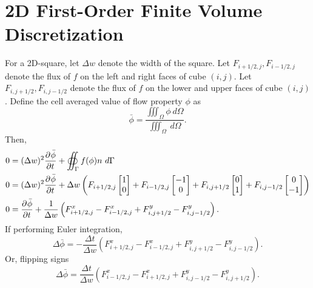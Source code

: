 \documentclass{doc}
\begin{document}
\section{2D First-Order Finite Volume Discretization}
For a 2D-square, let $\Delta w$ denote the width of the square.
Let $F_{i+1/2,j}, F_{i-1/2,j}$ denote the flux of $f$ on
the left and right faces of cube $(i,j)$.
Let $F_{i,j+1/2}, F_{i,j-1/2}$ denote the flux of $f$ on
the lower and upper faces of cube $(i,j)$.
%
Define the cell averaged value of flow property $\phi$ as
\begin{equation}
    \bar{\phi} = \frac{\iiint_\Omega \phi\ d\Omega}{\iiint_\Omega \ d\Omega}.
\end{equation}
Then,
\begin{align}
    0 &= (\Delta w)^2 \pd{\bar{\phi}}{t} + \oiint_\Gamma f(\phi) n \ d\Gamma \\
    0 &= (\Delta w)^2 \pd{\bar{\phi}}{t} + \Delta w \left(
        F_{i+1/2,j} \begin{bmatrix} 1\\  0 \end{bmatrix} +
        F_{i-1/2,j} \begin{bmatrix}-1\\  0 \end{bmatrix} +
        F_{i,j+1/2} \begin{bmatrix} 0\\  1 \end{bmatrix} +
        F_{i,j-1/2} \begin{bmatrix} 0\\ -1 \end{bmatrix}
    \right) \\
    0 &= \pd{\bar{\phi}}{t} + \frac{1}{\Delta w} \left(
        F^x_{i+1/2,j} -
        F^x_{i-1/2,j} +
        F^y_{i,j+1/2} -
        F^y_{i,j-1/2} 
    \right).
\end{align}
If performing Euler integration,
\begin{equation}
    \Delta \bar{\phi} = -\frac{\Delta t}{\Delta w} \left(
        F^x_{i+1/2,j} -
        F^x_{i-1/2,j} +
        F^y_{i,j+1/2} -
        F^y_{i,j-1/2} 
    \right).
\end{equation}
Or, flipping signs
\begin{equation}
    \Delta \bar{\phi} = \frac{\Delta t}{\Delta w} \left(
        F^x_{i-1/2,j} -
        F^x_{i+1/2,j} +
        F^y_{i,j-1/2} -
        F^y_{i,j+1/2}
    \right).
\end{equation}
\end{document}

